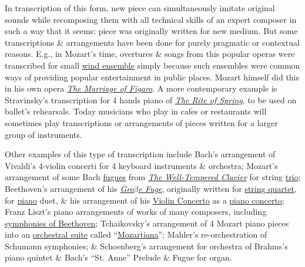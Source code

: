 \documentclass{article}
\begin{document}
In transcription of this form, new piece can simultaneously imitate original sounds while recomposing them with all technical skills of an expert composer in such a way that it seems: piece was originally written for new medium. But some transcriptions \& arrangements have been done for purely pragmatic or contextual reasons. E.g., in Mozart's time, overtures \& songs from this popular operas were transcribed for small \href{https://en.wikipedia.org/wiki/Wind_ensemble}{wind ensemble} simply because such ensembles were common ways of providing popular entertainment in public places. {\sc Mozart} himself did this in his own opera \href{https://en.wikipedia.org/wiki/The_Marriage_of_Figaro}{\it The Marriage of Figaro}. A more contemporary example is {\sc Stravinsky}'s transcription for 4 hands piano of \href{https://en.wikipedia.org/wiki/The_Rite_of_Spring}{\it The Rite of Spring}, to be used on ballet's rehearsals. Today musicians who play in cafes or restaurants will sometimes play transcriptions or arrangements of pieces written for a larger group of instruments.

Other examples of this type of transcription include {\sc Bach}'s arrangement of {\sc Vivaldi}'s 4-violin concerti for 4 keyboard instruments \& orchestra; {\sc Mozart}'s arrangement of some Bach \href{https://en.wikipedia.org/wiki/Fugue}{fugues} from \href{https://en.wikipedia.org/wiki/The_Well-Tempered_Clavier}{\it The Well-Tempered Clavier} for string \href{https://en.wikipedia.org/wiki/Trio_(music)}{trio}; {\sc Beethoven}'s arrangement of his \href{https://en.wikipedia.org/wiki/Gro%C3%9Fe_Fuge}{\it Gro$\beta$e Fuge}, originally written for \href{https://en.wikipedia.org/wiki/String_quartet}{string quartet}, for \href{https://en.wikipedia.org/wiki/Piano}{piano} duet, \& his arrangement of his \href{https://en.wikipedia.org/wiki/Violin_Concerto_(Beethoven)}{Violin Concerto} as a \href{https://en.wikipedia.org/wiki/Piano_concerto}{piano concerto}; Franz Liszt's piano arrangements of works of many composers, including \href{https://en.wikipedia.org/wiki/Beethoven_Symphonies_(Liszt)}{symphonies of Beethoven}; {\sc Tchaikovsky}'s arrangement of 4 Mozart piano pieces into an \href{https://en.wikipedia.org/wiki/Orchestral_suite}{orchestral suite} called ``\href{https://en.wikipedia.org/wiki/Orchestral_Suite_No._4_Mozartiana_(Tchaikovsky)}{Mozartiana}''; {\sc Mahler}'s re-orchestration of {\sc Schumann} symphonies; \& {\sc Schoenberg}'s arrangement for orchestra of {\sc Brahms}'s piano quintet \& {\sc Bach}'s ``St. Anne'' Prelude \& Fugue for organ.
\end{document}
